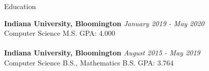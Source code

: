 \documentclass{resume} %
\begin{document}

\begin{rSection}{Education}

{\bf Indiana University, Bloomington} \hfill {\em January 2019 - May 2020} \\
	Computer Science M.S. \hfill { GPA: 4.000 } \\ \\
{\bf Indiana University, Bloomington} \hfill {\em August 2015 - May 2019} \\
Computer Science B.S., Mathematics B.S. \hfill { GPA: 3.764 }


\end{rSection}



\end{document}
